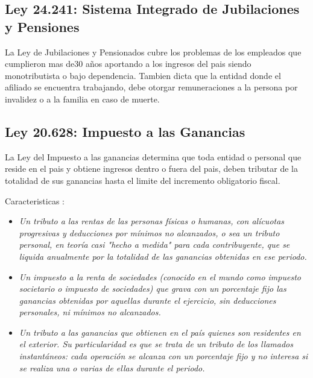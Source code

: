 \documentclass[
10pt, %
a4paper, %
oneside, %
headinclude,footinclude, %
BCOR5mm, %
]{scrartcl}
\begin{document}
  \subsection{Ley 24.241: Sistema Integrado de Jubilaciones y Pensiones}
  \begin{flushleft}
  La Ley de Jubilaciones y Pensionados cubre los problemas de los empleados
  que cumplieron mas de30 a\~nos aportando a los ingresos del pais siendo
  monotributista o bajo dependencia.
  Tambien dicta que la entidad donde el afiliado se encuentra trabajando,
  debe otorgar remuneraciones a la persona por invalidez o a la familia
  en caso de muerte.
  \end{flushleft}

  \subsection{Ley 20.628: Impuesto a las Ganancias}
  \begin{flushleft}
  La Ley del Impuesto a las ganancias determina que toda entidad o personal
  que reside en el pais y obtiene ingresos dentro o fuera del pais, deben
  tributar de la totalidad de sus ganancias hasta el limite del incremento
  obligatorio fiscal.

  Caracteristicas :
  \begin{itemize}
    \item \emph{Un tributo a las rentas de las personas físicas o humanas, con
                alícuotas progresivas y deducciones por mínimos no alcanzados,
                o sea un tributo personal, en teoría casi "hecho a medida" para
                cada contribuyente, que se liquida anualmente por la totalidad
                de las ganancias obtenidas en ese periodo.}
    \item \emph{Un impuesto a la renta de sociedades (conocido en el mundo como
                impuesto societario o impuesto de sociedades) que grava con un
                porcentaje fijo las ganancias obtenidas por aquellas durante el
                ejercicio, sin deducciones personales, ni mínimos no alcanzados.}
    \item \emph{Un tributo a las ganancias que obtienen en el país quienes son
                residentes en el exterior. Su particularidad es que se trata de
                un tributo de los llamados instantáneos: cada operación se
                alcanza con un porcentaje fijo y no interesa si se realiza una o
                varias de ellas durante el periodo.}
  \end{itemize}
  \end{flushleft}
\end{document}
